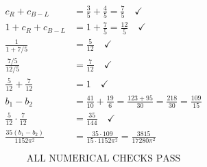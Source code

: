 \documentclass[11pt,a4paper]{article}
\theoremstyle{definition}
\begin{document}
\begin{align}
\label{eq:num_ver_1}
c_R + c_{B-L} &= \frac{3}{5} + \frac{4}{5} = \frac{7}{5} \quad \checkmark \\
\label{eq:num_ver_2}
1 + c_R + c_{B-L} &= 1 + \frac{7}{5} = \frac{12}{5} \quad \checkmark \\
\label{eq:num_ver_3}
\frac{1}{1 + 7/5} &= \frac{5}{12} \quad \checkmark \\
\label{eq:num_ver_4}
\frac{7/5}{12/5} &= \frac{7}{12} \quad \checkmark \\
\label{eq:num_ver_5}
\frac{5}{12} + \frac{7}{12} &= 1 \quad \checkmark \\
\label{eq:num_ver_6}
b_1 - b_2 &= \frac{41}{10} + \frac{19}{6} = \frac{123 + 95}{30} = \frac{218}{30} = \frac{109}{15} \\
\label{eq:num_ver_7}
\frac{5}{12}\cdot\frac{7}{12} &= \frac{35}{144} \quad \checkmark \\
\label{eq:num_ver_8}
\frac{35(b_1 - b_2)}{1152\pi^2} &= \frac{35 \cdot 109}{15 \cdot 1152\pi^2} = \frac{3815}{17280\pi^2}
\end{align}

\begin{equation}
\label{eq:num_final}
\text{ALL NUMERICAL CHECKS PASS}
\end{equation}
\end{document}
